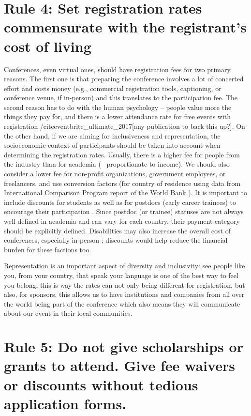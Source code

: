 \documentclass[10pt,letterpaper]{article}
\begin{document}
\section*{Rule 4: Set registration rates commensurate with the registrant's cost of living}

Conferences, even virtual ones, should have registration fees for two primary reasons. The first one is that preparing the conference involves a lot of concerted effort and costs money (e.g., commercial registration tools, captioning, or conference venue, if in-person) and this translates to the participation fee. The second reason has to do with the human psychology -- people value more the things they pay for, and there is a lower attendance rate for free events with registration /cite{eventbrite_ultimate_2017}[any publication to back this up?]. On the other hand, if we are aiming for inclusiveness and representation, the socioeconomic context of participants should be taken into account when determining the registration rates. Usually, there is a higher fee for people from the industry than for academia (~ proportionate to income). We should also consider a lower fee for non-profit organizations, government employees, or freelancers, and use conversion factors (for country of residence using data from International Comparison Program report of the World Bank \cite{arend_disparity_2019}). It is important to include discounts for students as well as for postdocs (early career trainees) to encourage their participation \cite{sarabipour_evaluating_2020, andalib_postdoc_2018, kaplan_postdoc_2012}. Since postdoc (or trainee) statuses are not always well-defined in academia and can vary for each country, their payment category should be explicitly defined. Disabilities may also increase the overall cost of conferences, especially in-person \cite{de_picker_rethinking_2020, irish_increasing_2020}; discounts would help reduce the financial burden for these factions too.

Representation is an important aspect of diversity and inclusivity: see people like you, from your country, that speak your language is one of the best way to feel you belong, this is way the rates can not only being different for registration, but also, for sponsors, this allows us to have institutions and companies from all over the world being part of the conference which also means they will communicate about our event in their local communities.


\section*{Rule 5: Do not give scholarships or grants to attend. Give fee waivers or discounts without tedious application forms.}
\end{document}
